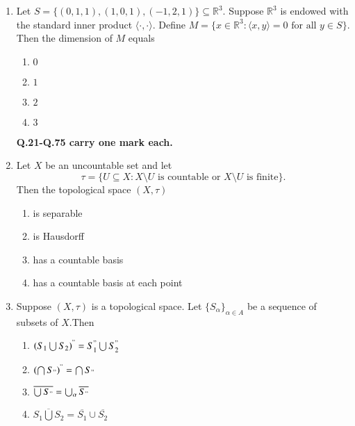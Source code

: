 \documentclass[journal]{IEEEtran}
\numberwithin{equation}{enumi}
\numberwithin{figure}{enumi}
\begin{document}
\begin{enumerate}
\item Let $S = \{(0,1,1), (1,0,1), (-1,2,1)\} \subseteq \mathbb{R}^3$. Suppose $\mathbb{R}^3$ is endowed with the standard inner product $\langle \cdot , \cdot \rangle$. Define $M = \{x \in \mathbb{R}^3 : \langle x, y \rangle = 0 \text{ for all } y \in S\}$. Then the dimension of $M$ equals \hfill{}
\begin{multicols}{4}
\begin{enumerate}
    \item $0$
    \item $1$
    \item $2$
    \item $3$ 
\end{enumerate}
\end{multicols}



\begin{center}
    \textbf{Q.21-Q.75 carry one mark each.}
\end{center}
\vspace{1em}

\item Let $X$ be an uncountable set and let
\[
\tau = \{U \subseteq X : X \setminus U \text{ is countable or } X \setminus U \text{ is finite} \}.
\]
Then the topological space $(X, \tau)$        \hfill{}

\begin{enumerate}
    \item is separable
    \item is Hausdorff
    \item has a countable basis
    \item has a countable basis at each point
\end{enumerate}



\item Suppose $(X, \tau)$ is a topological space. Let $\{S_\alpha\}_{\alpha \in A}$ be a sequence of subsets of $X$.\newline Then \hfill{}

\begin{enumerate}
    \item $\left(S_1\bigcup S_2\right)^" = S_1^" \bigcup S_2^" $
    \item $\left(\bigcap S_"\right)^" = \bigcap S_"$
    \item $\overline{\bigcup S_"} = \bigcup_\alpha \overline{S_"}$
    \item $\overline{S_1\bigcup S_2} = \overline{S_1} \cup \overline{S_2}$
\end{enumerate}



\end{enumerate}
\end{document}
